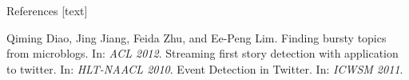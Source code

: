 \documentclass{beamer}
\begin{document}
\begin{frame}
\begin{columns}[T]
\begin{column}{.46\textwidth}
{\begin{block}{References}
[text]
\begin{thebibliography}{9}
\footnotesize{Qiming Diao, Jing Jiang, Feida Zhu, and Ee-Peng Lim. Finding bursty topics from microblogs. In: \emph{ACL 2012}.}
\footnotesize{Streaming first story detection with application to twitter. In: \emph{HLT-NAACL 2010}.}
\footnotesize{Event Detection in Twitter. In: \emph{ICWSM 2011}.}
\end{thebibliography}
\vspace*{-1.25ex}
\end{block}
}
\end{column}

\end{columns}
\end{frame}
\end{document}
